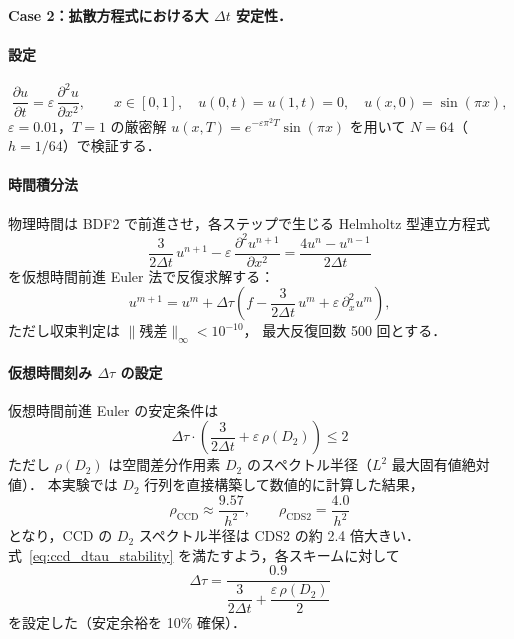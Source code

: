 \paragraph{Case 2：拡散方程式における大 \texorpdfstring{$\Delta t$}{Δt} 安定性．}\label{app:ccd_case2}

\paragraph{設定}
\begin{equation}
  \frac{\partial u}{\partial t} = \varepsilon\,\frac{\partial^2 u}{\partial x^2},
  \qquad x \in [0,1],\quad u(0,t)=u(1,t)=0,\quad u(x,0)=\sin(\pi x),
  \label{eq:ccd_parabolic}
\end{equation}
$\varepsilon = 0.01$，$T = 1$ の厳密解 $u(x,T) = e^{-\varepsilon\pi^2 T}\sin(\pi x)$
を用いて $N = 64$（$h = 1/64$）で検証する．

\paragraph{時間積分法}
物理時間は BDF2 で前進させ，各ステップで生じる Helmholtz 型連立方程式
\begin{equation}
  \frac{3}{2\Delta t}\,u^{n+1} - \varepsilon\,\frac{\partial^2 u^{n+1}}{\partial x^2}
  = \frac{4u^n - u^{n-1}}{2\Delta t}
  \label{eq:ccd_helmholtz}
\end{equation}
を仮想時間前進 Euler 法で反復求解する：
\begin{equation}
  u^{m+1} = u^m + \Delta\tau\!\left(
    f - \frac{3}{2\Delta t}\,u^m + \varepsilon\,\partial^2_x u^m
  \right),
  \label{eq:ccd_pseudotime}
\end{equation}
ただし収束判定は $\|\text{残差}\|_\infty < 10^{-10}$，
最大反復回数 500 回とする．

\paragraph{仮想時間刻み $\Delta\tau$ の設定}
仮想時間前進 Euler の安定条件は
\begin{equation}
  \Delta\tau \cdot \left(\frac{3}{2\Delta t} + \varepsilon\,\rho(D_2)\right) \leq 2
  \label{eq:ccd_dtau_stability}
\end{equation}
ただし $\rho(D_2)$ は空間差分作用素 $D_2$ のスペクトル半径（$L^2$ 最大固有値絶対値）．
本実験では $D_2$ 行列を直接構築して数値的に計算した結果，
\begin{equation}
  \rho_{\text{CCD}} \approx \frac{9.57}{h^2},
  \qquad
  \rho_{\text{CDS2}} = \frac{4.0}{h^2}
  \label{eq:ccd_spectral_radius}
\end{equation}
となり，CCD の $D_2$ スペクトル半径は CDS2 の約 2.4 倍大きい．
式~\eqref{eq:ccd_dtau_stability} を満たすよう，各スキームに対して
\begin{equation}
  \Delta\tau = \frac{0.9}{\dfrac{3}{2\Delta t} + \dfrac{\varepsilon\,\rho(D_2)}{2}}
  \label{eq:ccd_dtau}
\end{equation}
を設定した（安定余裕を 10\% 確保）．

